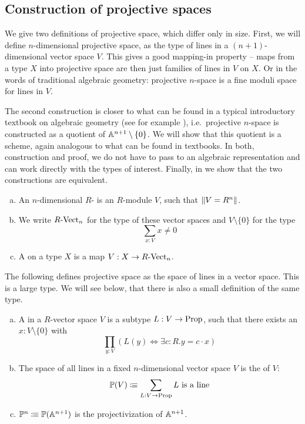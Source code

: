 
\subsection{Construction of projective spaces}
We give two definitions of projective space, which differ only in size.
First, we will define $n$-dimensional projective space,
as the type of lines in a $(n+1)$-dimensional vector space $V$.
This gives a good mapping-in property --
maps from a type $X$ into projective space are then just families of lines in $V$ on $X$.
Or in the words of traditional algebraic geometry:
projective $n$-space is a fine moduli space for lines in $V$.

The second construction is closer to what can be found in a typical
introductory textbook on algebraic geometry
(see for example \cite[Section I.2]{Hartshorne}),
i.e.\ projective $n$-space is constructed as a quotient of $\mathbb{A}^{n+1}\setminus\{0\}$.
We will show that this quotient is a scheme,
again analogous to what can be found in textbooks.
In both, construction and proof,
we do not have to pass to an algebraic representation
and can work directly with the types of interest.
Finally, in 
we show that the two constructions are equivalent.

\begin{definition}%
  \begin{enumerate}[(a)]
  \item An $n$-dimensional $R$- is an $R$-module $V$,
    such that $\lVert  V = R^n  \rVert$. 
  \item We write $R\text{-}\mathrm{Vect}_{n}$ for the type of these vector spaces and $V\setminus\{0\}$ for the type
    \[ \sum_{x:V}x\neq 0\]
  \item A  on a type $X$ is a map $V:X\to R\text{-}\mathrm{Vect}_{n}$. 
  \end{enumerate}
\end{definition}

The following defines projective space as the space of lines in a vector space.
This is a large type.
We will see below, that there is also a small definition of the same type.

\begin{definition}%
  \label{projective-space-as-space-of-lines}
  \begin{enumerate}[(a)]
  \item A  in a $R$-vector space $V$ is a subtype $L:V\to \mathrm{Prop}$,
    such that there exists an $x:V\setminus\{0\}$ with
    \[ \prod_{y:V}\left(L (y) \Leftrightarrow \exists c:R.y=c\cdot x\right)\]
  \item The space of all lines in a fixed $n$-dimensional vector space $V$ is the  of $V$:
    \[ \mathbb{P}(V)\vcentcolon\mspace{-1.2mu}\equiv \sum_{L:V\to \mathrm{Prop}} L \text{ is a line}  \]
  \item {} $\mathbb{P}^n \vcentcolon\mspace{-1.2mu}\equiv \mathbb{P}(\mathbb{A}^{n+1})$ is the projectivization of $\mathbb{A}^{n+1}$.
  \end{enumerate}
\end{definition}

